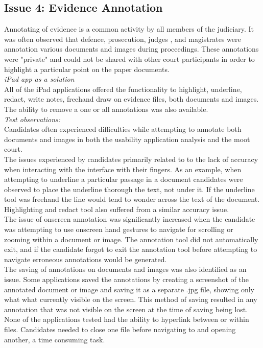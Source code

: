 \documentclass{article}
\begin{document}
\subsection{Issue 4: Evidence Annotation}
Annotating of evidence is a common activity by all members of the judiciary. It was often observed that defence, prosecution, judges , and magistrates were annotation various documents and images during proceedings. These annotations were "private" and could not be shared with other court participants in order to highlight a particular point on the paper documents.
\\
\textit{iPad app as a solution}\\
All of the iPad applications offered the functionality to highlight, underline, redact, write notes, freehand draw on evidence files, both documents and images. The ability to remove a one or all annotations was also available.
\\
\textit{Test observations:}\\
Candidates often experienced difficulties while attempting to annotate both documents and images in both the usability application analysis and the moot court.\\
The issues experienced by candidates primarily related to to the lack of accuracy when interacting with the interface with their fingers. As an example, when attempting to underline a particular passage in a document candidates were observed to place the underline thorough the text, not under it. If the underline tool was freehand the line would tend to wonder across the text of the document. Highlighting and redact tool also suffered from a similar accuracy issue.\\
The issue of onscreen annotation was significantly increased when the candidate was attempting to use onscreen hand gestures to navigate for scrolling or zooming within a document or image. The annotation tool did not automatically exit, and if the candidate forgot to exit the annotation tool before attempting to navigate erroneous annotations  would be generated.\\
The saving of annotations on documents and images was also identified as an issue. Some applications saved the annotations by creating a screenshot of the annotated document or image and saving it as a separate .jpg file, showing only what what currently visible on the screen. This method of saving resulted in any annotation that was not visible on the screen at the time of saving being lost.
None of the applications tested had the ability to hyperlink between or within files. Candidates needed to close one file before navigating to and opening another, a time consuming task.
\end{document}
